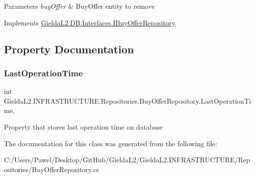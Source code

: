 \begin{DoxyParams}{Parameters}
{\em buy\+Offer} & Buy\+Offer entity to remove\\
\hline
\end{DoxyParams}


Implements \mbox{\hyperlink{interface_gielda_l2_1_1_d_b_1_1_interfaces_1_1_i_buy_offer_repository_af9d25dfd52c71cc21dd7a89bf54f2ee4}{Gielda\+L2.\+D\+B.\+Interfaces.\+I\+Buy\+Offer\+Repository}}.



\subsection{Property Documentation}
\mbox{\label{class_gielda_l2_1_1_i_n_f_r_a_s_t_r_u_c_t_u_r_e_1_1_repositories_1_1_buy_offer_repository_aa2fa49c9bc8775391160b85ea09d0cda}} 
\subsubsection{\texorpdfstring{LastOperationTime}{LastOperationTime}}
{\footnotesize\ttfamily int Gielda\+L2.\+I\+N\+F\+R\+A\+S\+T\+R\+U\+C\+T\+U\+R\+E.\+Repositories.\+Buy\+Offer\+Repository.\+Last\+Operation\+Time\hspace{0.3cm}{\ttfamily [get]}, {\ttfamily [set]}}



Property that stores last operation time on database 



The documentation for this class was generated from the following file\+:\begin{DoxyCompactItemize}
\item 
C\+:/\+Users/\+Pawel/\+Desktop/\+Git\+Hub/\+Gielda\+L2/\+Gielda\+L2.\+I\+N\+F\+R\+A\+S\+T\+R\+U\+C\+T\+U\+R\+E/\+Repositories/Buy\+Offer\+Repository.\+cs\end{DoxyCompactItemize}
